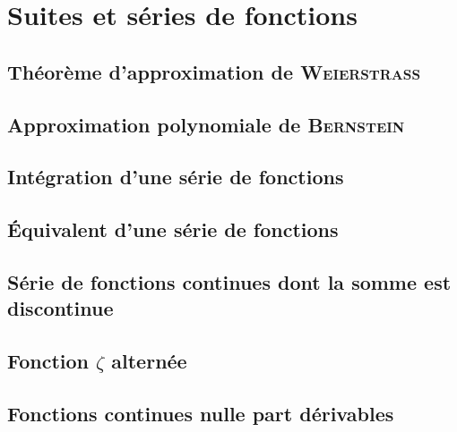 \chapter{Suites et séries de fonctions}



\newpage

\section{Théorème d'approximation de \textsc{Weierstrass}}


\section{Approximation polynomiale de \textsc{Bernstein}}


\section{Intégration d'une série de fonctions}


\section{Équivalent d'une série de fonctions}


\section{Série de fonctions continues dont la somme est discontinue}


\section{Fonction \texorpdfstring{$\zeta$}{zêta} alternée}


\section{Fonctions continues nulle part dérivables}

